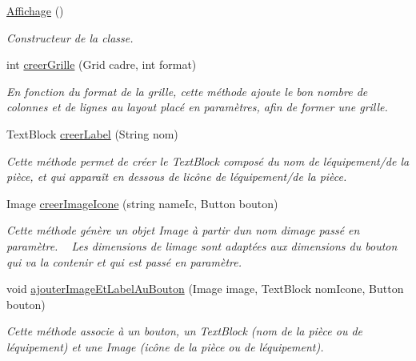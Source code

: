 \begin{DoxyCompactItemize}
\item 
\hyperlink{class_my_domotik_1_1_affichage_a968c2ddc894d6f891b87ea5ff5b70ddb}{Affichage} ()
\begin{DoxyCompactList}\small\item\em Constructeur de la classe. \end{DoxyCompactList}\item 
int \hyperlink{class_my_domotik_1_1_affichage_a30f15e20c10b05dbe0f1e23f3c643811}{creer\+Grille} (Grid cadre, int format)
\begin{DoxyCompactList}\small\item\em En fonction du format de la grille, cette méthode ajoute le bon nombre de colonnes et de lignes au layout placé en paramètres, afin de former une grille. \end{DoxyCompactList}\item 
Text\+Block \hyperlink{class_my_domotik_1_1_affichage_a3515202e920650f529f661ddcee4d165}{creer\+Label} (String nom)
\begin{DoxyCompactList}\small\item\em Cette méthode permet de créer le Text\+Block composé du nom de l\textquotesingle{}équipement/de la pièce, et qui apparaît en dessous de l\textquotesingle{}icône de l\textquotesingle{}équipement/de la pièce. \end{DoxyCompactList}\item 
Image \hyperlink{class_my_domotik_1_1_affichage_a3d4c5ed0d38562242c0ca3463add9947}{creer\+Image\+Icone} (string name\+Ic, Button bouton)
\begin{DoxyCompactList}\small\item\em Cette méthode génère un objet Image à partir d\textquotesingle{}un nom d\textquotesingle{}image passé en paramètre. ~\newline
Les dimensions de l\textquotesingle{}image sont adaptées aux dimensions du bouton qui va la contenir et qui est passé en paramètre. \end{DoxyCompactList}\item 
void \hyperlink{class_my_domotik_1_1_affichage_ac2c4053c17bc779af2b6cf55f0bcaafd}{ajouter\+Image\+Et\+Label\+Au\+Bouton} (Image image, Text\+Block nom\+Icone, Button bouton)
\begin{DoxyCompactList}\small\item\em Cette méthode associe à un bouton, un Text\+Block (nom de la pièce ou de l\textquotesingle{}équipement) et une Image (icône de la pièce ou de l\textquotesingle{}équipement). \end{DoxyCompactList}\item 

\end{DoxyCompactItemize}
